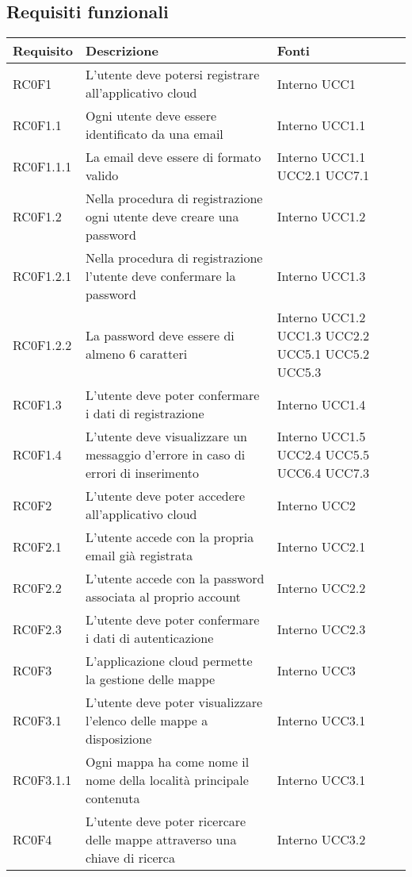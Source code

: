\subsection{Requisiti funzionali}
\begin{center}
\bgroup
\def\arraystretch{1.8}
\begin{longtable}{|l|p{7cm}|p{1.7cm}|} \hline
\textbf{Requisito} & \textbf{Descrizione} & \textbf{Fonti} \\\hline
RC0F1		& L'utente deve potersi registrare all'applicativo cloud & Interno UCC1 \\\hline
RC0F1.1		& Ogni utente deve essere identificato da una email & Interno UCC1.1 \\\hline
RC0F1.1.1	& La email deve essere di formato valido & Interno UCC1.1 UCC2.1 UCC7.1 \\\hline
RC0F1.2		& Nella procedura di registrazione ogni utente deve creare una password & Interno UCC1.2 \\\hline
RC0F1.2.1	& Nella procedura di registrazione l'utente deve confermare la password & Interno UCC1.3 \\\hline
RC0F1.2.2	& La password deve essere di almeno 6 caratteri & Interno UCC1.2 UCC1.3 UCC2.2 UCC5.1 UCC5.2 UCC5.3 \\\hline
RC0F1.3		& L'utente deve poter confermare i dati di registrazione & Interno UCC1.4 \\\hline
RC0F1.4		& L'utente deve visualizzare un messaggio d'errore in caso di errori di inserimento & Interno UCC1.5 UCC2.4 UCC5.5 UCC6.4 UCC7.3 \\\hline
RC0F2		& L'utente deve poter accedere all'applicativo cloud & Interno UCC2 \\\hline
RC0F2.1		& L'utente accede con la propria email già registrata & Interno UCC2.1 \\\hline
RC0F2.2		& L'utente accede con la password associata al proprio account & Interno UCC2.2 \\\hline
RC0F2.3		& L'utente deve poter confermare i dati di autenticazione & Interno UCC2.3 \\\hline
RC0F3 		& L'applicazione cloud permette la gestione delle mappe & Interno UCC3 \\\hline
RC0F3.1		& L'utente deve poter visualizzare l'elenco delle mappe a disposizione & Interno UCC3.1 \\\hline
RC0F3.1.1	& Ogni mappa ha come nome il nome della località principale contenuta & Interno UCC3.1 \\\hline
RC0F4 		& L'utente deve poter ricercare delle mappe attraverso una chiave di ricerca & Interno UCC3.2 \\\hline

\end{longtable}
\end{center}
